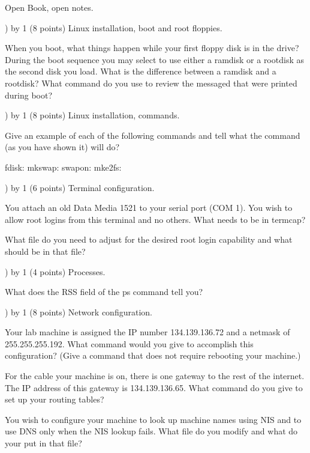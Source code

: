 
\parskip=0pt
\parindent=0in
\nopagenumbers
\newcount\quesno
{}
\def\ques{\number\quesno) \advance\quesno by 1}
\def\aspace{\vskip 1.5in}

Open Book, open notes.

\ques
(8 points)
Linux installation, boot and root floppies.

When you boot, what things happen while your first floppy disk is in the
drive?
\vskip 1.5in
During the boot sequence you may select to use either a ramdisk or a rootdisk
as the second disk you load.
What is the difference between a ramdisk and a rootdisk?
\vskip 1in
What command do you use to review the messaged that were printed during boot?
\vskip 0.7in

\ques
(8 points)
Linux installation, commands.

Give an example of each of the following commands and tell what the
command (as you have shown it) will do?

fdisk:
\vskip 0.8in
mkswap:
\vskip 0.8in
swapon:
\vskip 0.8in
mke2fs:
\vfill\eject

\ques
(6 points)
Terminal configuration.

You attach an old Data Media 1521 to your serial port (COM 1).
You wish to allow root logins from this terminal and no others.
What needs to be in termcap?
\vskip 0.8in

What file do you need to adjust for the desired root login capability and
what should be in that file?
\vskip 1in

\ques
(4 points)
Processes.

What does the RSS field of the ps command tell you?
\vskip 0.8in

\ques
(8 points)
Network configuration.

Your lab machine is assigned the IP number 134.139.136.72 and a netmask
of 255.255.255.192.
What command would you give to accomplish this configuration?
(Give a command that does not require rebooting your machine.)
\vskip 0.8in

For the cable your machine is on, there is one gateway to the rest of the
internet.
The IP address of this gateway is 134.139.136.65.
What command do you give to set up your routing tables?
\vskip 0.8in

You wish to configure your machine to look up machine names using NIS
and to use DNS only when the NIS lookup fails.
What file do you modify and what do your put in that file?
\vskip 1.2in

